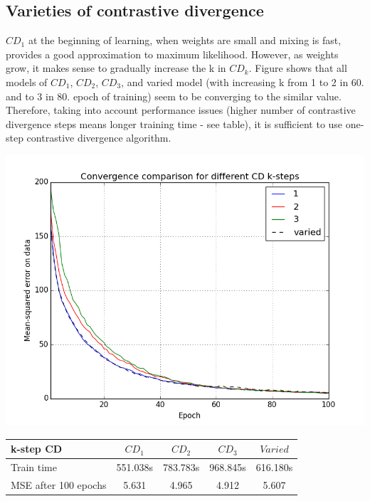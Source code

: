 \documentclass[a4paper]{scrartcl}
\begin{document}
\subsection{Varieties of contrastive divergence}
$CD_1$ at the beginning of learning, when weights are small and mixing is fast, provides a good approximation to maximum likelihood. However, as weights grow, it makes sense to gradually increase the k in $CD_k$.
Figure shows that all models of $CD_1$, $CD_2$, $CD_3$, and varied model (with increasing k from 1 to 2 in 60. and to 3 in 80. epoch of training) seem to be converging to the similar value. Therefore, taking into account performance issues (higher number of contrastive divergence steps means longer training time - see table), it is sufficient to use one-step contrastive divergence algorithm.
\begin{center}
\includegraphics[width=14cm]{images/CDk_var.png}
\end{center}
\hspace{1cm}
\begin{tabular}{|l||c|c|c|c|} \hline
k-step CD & $CD_1$ & $CD_2$ & $CD_3$ & $Varied$
\\ \hline
Train time & 551.038s & 783.783s & 968.845s & 616.180s
\\ \hline
MSE after 100 epochs & 5.631 & 4.965 & 4.912 & 5.607
\\ \hline \end{tabular}
\end{document}
